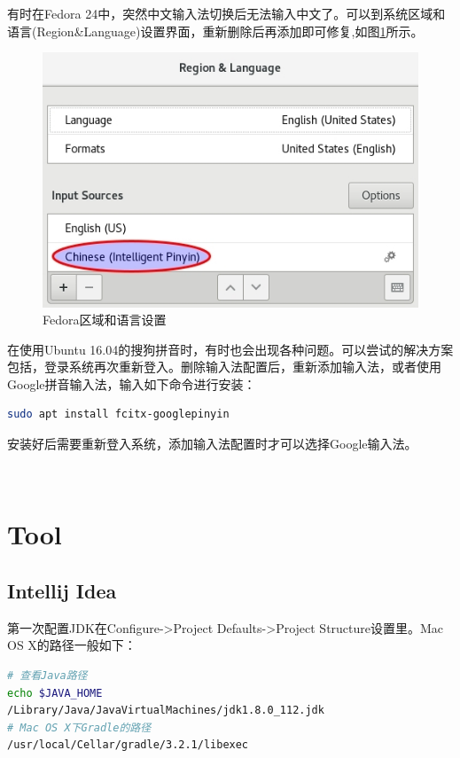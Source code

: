 \documentclass[12pt]{book}
\numberwithin{dummy}{section}
\theoremstyle{ocrenumbox}
\theoremstyle{blacknumex}
\theoremstyle{blacknumbox}
\theoremstyle{ocrenum}
\begin{document}
有时在Fedora 24中，突然中文输入法切换后无法输入中文了。可以到系统区域和语言(Region\&Language)设置界面，重新删除后再添加即可修复,如图\ref{fig:regionandlanguagesetting}所示。

\begin{figure}[htbp]
	\centering
	\includegraphics[scale=0.6]{regionandlanguagesetting.jpg}
	\caption{Fedora区域和语言设置}
	\label{fig:regionandlanguagesetting}
\end{figure}

在使用Ubuntu 16.04的搜狗拼音时，有时也会出现各种问题。可以尝试的解决方案包括，登录系统再次重新登入。删除输入法配置后，重新添加输入法，或者使用Google拼音输入法，输入如下命令进行安装：

\begin{lstlisting}[language=Bash]
sudo apt install fcitx-googlepinyin
\end{lstlisting}

安装好后需要重新登入系统，添加输入法配置时才可以选择Google输入法。

\newpage
~\vfil 

\part{Tool}

\newpage

\chapter{Intellij Idea}

第一次配置JDK在Configure->Project Defaults->Project Structure设置里。Mac OS X的路径一般如下：

\begin{lstlisting}[language=Bash]
# 查看Java路径
echo $JAVA_HOME
/Library/Java/JavaVirtualMachines/jdk1.8.0_112.jdk
# Mac OS X下Gradle的路径
/usr/local/Cellar/gradle/3.2.1/libexec
\end{lstlisting}
\end{document}
